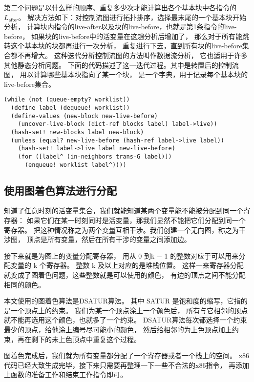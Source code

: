 第二个问题是以什么样的顺序、重复多少次才能计算出各个基本块中各指令的$L_{\mathsf{after}}$。
解决方法如下：对控制流图进行拓扑排序，选择最末尾的一个基本块开始分析，
计算块内指令的live-after以及块的live-before，也就是第1条指令的live-before，
如果块的live-before中的活变量在这趟分析后增加了，
那么对于所有能跳转这个基本块的块都再进行一次分析，
重复进行下去，直到所有块的live-before集合都不再增大。
这种迭代分析控制流图的方法叫作数据流分析\cite{Kildall_1973}，
它也适用于许多其他静态分析问题。
下面的代码描述了这一迭代过程。其中是转置后的控制流图，
用以计算哪些基本块指向了某一个块，
是一个字典，用于记录每个基本块的live-before集合。

\begin{lstlisting}
(while (not (queue-empty? worklist))
  (define label (dequeue! worklist))
  (define-values (new-block new-live-before)
    (uncover-live-block (dict-ref blocks label) label->live))
  (hash-set! new-blocks label new-block)
  (unless (equal? new-live-before (hash-ref label->live label))
    (hash-set! label->live label new-live-before)
    (for ([label^ (in-neighbors trans-G label)])
      (enqueue! worklist label^))))
\end{lstlisting}

\subsection{使用图着色算法进行分配}

知道了任意时刻的活变量集合，我们就能知道某两个变量能不能被分配到同一个寄存器：
如果它们在某一时刻同时是活变量，那我们显然不能把它们分配到同一个寄存器。
把这种情况称之为两个变量互相干涉。我们创建一个无向图，称之为干涉图，
顶点是所有变量，然后在所有干涉的变量之间添加边。

接下来就是为图上的变量分配寄存器，
用从 0 到k − 1 的整数对应于可以用来分配变量的 k 个寄存器。
整数 k 及以上对应的是堆栈位置。
这样一来寄存器分配就变成了图着色问题，这些整数就是可以使用的颜色，
有边的顶点之间不能分配相同的颜色。

本文使用的图着色算法是DSATUR算法\cite{Brélaz_1979}。
其中 SATUR 是饱和度的缩写，它指的是一个顶点上的约束。
我们为某一个顶点涂上一个颜色后，
所有与它相邻的顶点就不能再选用这个颜色，也就多了一个约束。
DSATUR算法每次都选择一个约束最少的顶点，给他涂上编号尽可能小的颜色，
然后给相邻的为上色顶点加上约束，再在剩下的未上色顶点中重复这个过程。

图着色完成后，我们就为所有变量都分配了一个寄存器或者一个栈上的空间。
x86代码已经大致生成完毕，接下来只需要再整理一下一些不合法的x86指令，
再添加上函数的准备工作和结束工作指令即可。
